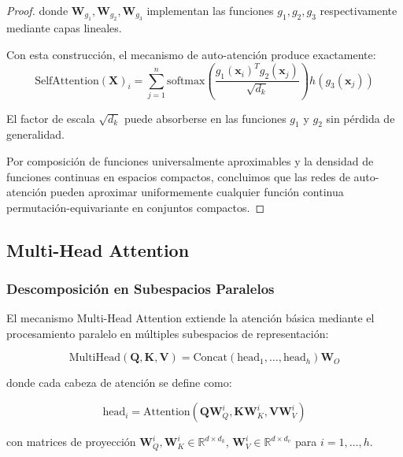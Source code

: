 \begin{proof}
    donde $\mathbf{W}_{g_1}, \mathbf{W}_{g_2}, \mathbf{W}_{g_3}$ implementan las funciones $g_1, g_2, g_3$ respectivamente mediante capas lineales.
    
    Con esta construcción, el mecanismo de auto-atención produce exactamente:
    \begin{equation}
        \text{SelfAttention}(\mathbf{X})_i = \sum_{j=1}^n \text{softmax}\left(\frac{g_1(\mathbf{x}_i)^T g_2(\mathbf{x}_j)}{\sqrt{d_k}}\right) h(g_3(\mathbf{x}_j))
        \label{eq:self_attention_implementation}
    \end{equation}
    
    El factor de escala $\sqrt{d_k}$ puede absorberse en las funciones $g_1$ y $g_2$ sin pérdida de generalidad.
    
    Por composición de funciones universalmente aproximables y la densidad de funciones continuas en espacios compactos, concluimos que las redes de auto-atención pueden aproximar uniformemente cualquier función continua permutación-equivariante en conjuntos compactos.
\end{proof}

\subsection{Multi-Head Attention}

\subsubsection{Descomposición en Subespacios Paralelos}

El mecanismo Multi-Head Attention extiende la atención básica mediante el procesamiento paralelo en múltiples subespacios de representación:

\begin{equation}
    \text{MultiHead}(\mathbf{Q}, \mathbf{K}, \mathbf{V}) = \text{Concat}(\text{head}_1, \ldots, \text{head}_h)\mathbf{W}_O
    \label{eq:multihead_attention}
\end{equation}

donde cada cabeza de atención se define como:

\begin{equation}
    \text{head}_i = \text{Attention}(\mathbf{Q}\mathbf{W}_Q^i, \mathbf{K}\mathbf{W}_K^i, \mathbf{V}\mathbf{W}_V^i)
    \label{eq:attention_head}
\end{equation}

con matrices de proyección $\mathbf{W}_Q^i, \mathbf{W}_K^i \in \mathbb{R}^{d \times d_k}$, $\mathbf{W}_V^i \in \mathbb{R}^{d \times d_v}$ para $i = 1, \ldots, h$.

